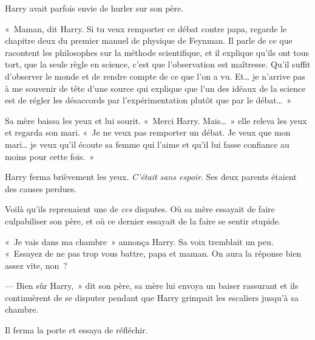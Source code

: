 Harry avait parfois envie de hurler sur son père.

«~Maman, dit Harry. Si tu veux remporter ce débat contre papa, regarde le chapitre deux du premier manuel de physique de Feynman. Il parle de ce que racontent les philosophes sur la méthode scientifique, et il explique qu'ils ont tous tort, que la seule règle en science, c'est que l'observation est maîtresse. Qu'il suffit d'observer le monde et de rendre compte de ce que l'on a vu. Et… je n'arrive pas à me souvenir de tête d'une source qui explique que l'un des idéaux de la science est de régler les désaccords par l'expérimentation plutôt que par le débat…~»

Sa mère baissa les yeux et lui sourit. «~Merci Harry. Mais…~» elle releva les yeux et regarda son mari. «~Je ne veux pas remporter un débat. Je veux que mon mari… je veux qu'il écoute sa femme qui l'aime et qu'il lui fasse confiance au moins pour cette fois.~»

Harry ferma brièvement les yeux. \emph{C'était sans espoir}. Ses deux parents étaient des causes perdues.

Voilà qu'ils reprenaient une de \emph{ces} disputes. Où sa mère essayait de faire culpabiliser son père, et où ce dernier essayait de la faire se
sentir stupide.

«~Je vais dans ma chambre~» annonça Harry. Sa voix tremblait un peu. «~Essayez de ne pas trop vous battre, papa et maman. On aura la réponse bien assez vite, non~?

--- Bien sûr Harry,~» dit son père, sa mère lui envoya un baiser rassurant et ils continuèrent de se disputer pendant que Harry grimpait les escaliers jusqu'à sa chambre.

Il ferma la porte et essaya de réfléchir.


